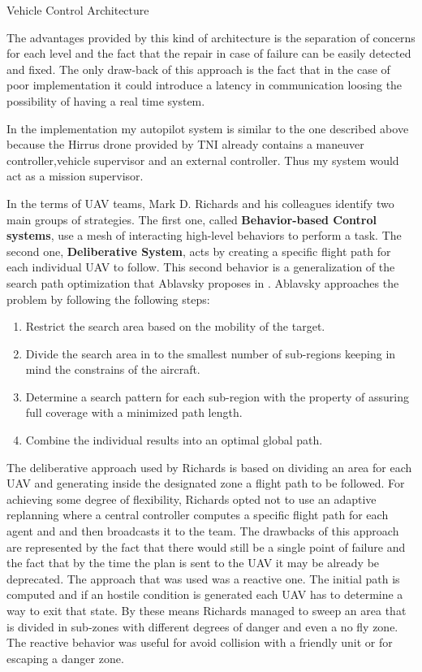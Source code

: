 {Vehicle Control Architecture}

\newpage
The advantages provided by this kind of architecture is the separation of
concerns for each level and the fact that the repair in case of failure can be
easily detected and fixed. The only draw-back of this approach is the fact
that in the case of poor implementation it could introduce a latency in communication
loosing the possibility of having a real time system.

In the implementation my autopilot system is similar to the one described above 
because the Hirrus drone \cite{hirrus} provided by TNI already contains
a maneuver controller,vehicle supervisor  and an external controller. Thus my
system would act as a mission supervisor.

In the terms of UAV teams, Mark D. Richards and his colleagues \cite{cooperative}
identify two main groups of strategies. The first one,  called \textbf{Behavior-based
Control systems}, use a mesh of interacting high-level behaviors to perform a 
task. The second one, \textbf{Deliberative System}, acts by creating a specific
flight path for each individual UAV to follow. This second behavior is a 
generalization of the search path optimization that  Ablavsky proposes in 
  \cite{path-optimization}. Ablavsky approaches the problem by following the 
following steps:

\begin{enumerate}
\item Restrict the search area based on the mobility of the target.
\item Divide the search area in to the smallest number of sub-regions keeping in
mind the constrains of the aircraft.
\item Determine a search pattern for each sub-region with the property of assuring
full coverage with a minimized path length.
\item Combine the individual results into an optimal global path.
\end{enumerate}

The deliberative approach used by Richards is based on dividing an area for 
each UAV and generating inside the designated zone a flight path to be followed.
For achieving some degree of flexibility, Richards opted not to use an adaptive
replanning where a central controller computes a specific flight path for each
agent and and then broadcasts it to the team. The drawbacks of this approach are
represented by the fact that there would still be a single point of failure and
the fact that by the time the plan is sent to the UAV it may be already be 
deprecated. The approach that was used was a reactive one. The initial path
is computed and if an hostile condition is generated each UAV has to determine
a way to exit that state. By these means Richards managed to sweep an area
that is divided in sub-zones with different degrees of danger and even a no fly
zone. The reactive behavior was useful for avoid collision with a friendly unit
or for escaping a danger zone.

